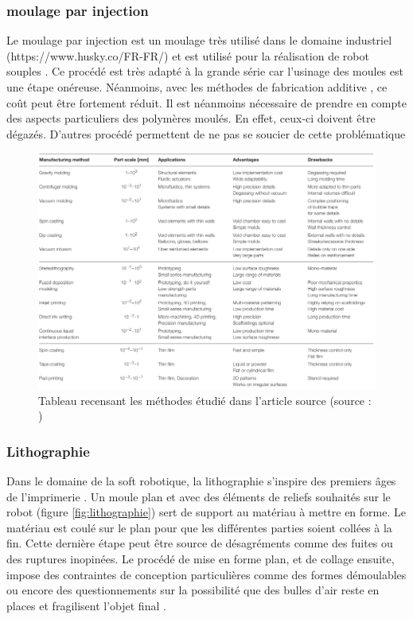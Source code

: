 \documentclass[10pt, a4paper]{article}
\begin{document}
        \subsubsection{moulage par injection}
        
            Le moulage par injection est un moulage très utilisé dans le domaine industriel (https://www.husky.co/FR-FR/) et est utilisé pour la réalisation de robot souples\cite{Marchese2015} \cite{Polygerinos2015}. Ce procédé est très adapté à la grande série car l'usinage des moules est une étape onéreuse. Néanmoins, avec les méthodes de fabrication additive \cite{Marchese2015} \cite{Polygerinos2015}, ce coût peut être fortement réduit. Il est néanmoins nécessaire de prendre en compte des aspects particuliers des polymères moulés. En effet, ceux-ci doivent être dégazés. D'autres procédé permettent de ne pas se soucier de cette problématique
        
            
\begin{figure}[ht!]
\centering
\includegraphics[scale=0.5]{ImageIntro/tableauMoulage.PNG}
\caption{ Tableau recensant les méthodes étudié dans l'article source (source : \cite{Schmitt2018})}
\label{fig:moulageTableau}
\end{figure}
            
        \subsubsection{Lithographie}
        
        Dans le domaine de la soft robotique, la lithographie s'inspire des premiers âges de l'imprimerie \cite{Marchese2015}. Un moule plan et avec des éléments de reliefs souhaités sur le robot (figure \ref{fig:lithographie}) sert de support au matériau à mettre en forme. Le matériau est coulé sur le plan pour que les différentes parties soient collées à la fin. Cette dernière étape peut être source de désagréments comme des fuites ou des ruptures inopinées. Le procédé de mise en forme plan, et de collage ensuite, impose des contraintes de conception particulières comme des formes démoulables ou encore des questionnements sur la possibilité que des bulles d'air reste en places et fragilisent l'objet final \cite{Marchese2015}.
        
\end{document}
